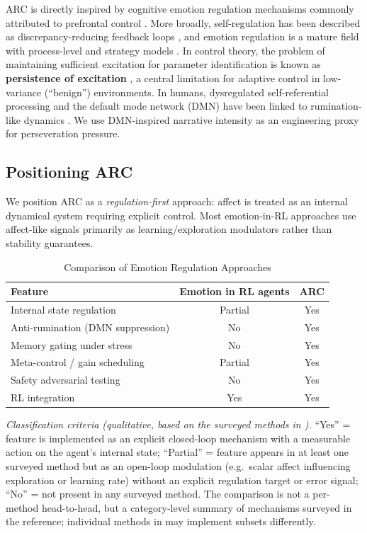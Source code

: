 \documentclass{article}
\begin{document}
ARC is directly inspired by cognitive emotion regulation mechanisms commonly attributed to prefrontal control \cite{Ochsner2005}. More broadly, self-regulation has been described as discrepancy-reducing feedback loops \cite{Carver1982}, and emotion regulation is a mature field with process-level and strategy models \cite{Gross1998}. In control theory, the problem of maintaining sufficient excitation for parameter identification is known as \textbf{persistence of excitation} \cite{Astrom2008}, a central limitation for adaptive control in low-variance (``benign'') environments.
In humans, dysregulated self-referential processing and the default mode network (DMN) have been linked to rumination-like dynamics \cite{Raichle2001, Buckner2008, Hamilton2015}. We use DMN-inspired narrative intensity as an engineering proxy for perseveration pressure.

\subsection{Positioning ARC}

We position ARC as a \textit{regulation-first} approach: affect is treated as an internal dynamical system requiring explicit control. Most emotion-in-RL approaches use affect-like signals primarily as learning/exploration modulators rather than stability guarantees.

\begin{table}[htbp]
\centering
\caption{Comparison of Emotion Regulation Approaches}
\label{tab:comparison}
\begin{tabular}{@{}lcc@{}}
\toprule
Feature & Emotion in RL agents \cite{Moerland2018} & \textbf{ARC} \\ \midrule
Internal state regulation & Partial & Yes \\
Anti-rumination (DMN suppression) & No & Yes \\
Memory gating under stress & No & Yes \\
Meta-control / gain scheduling & Partial & Yes \\
Safety adversarial testing & No & Yes \\
RL integration & Yes & Yes \\ \bottomrule
\end{tabular}
\end{table}

\textit{Classification criteria (qualitative, based on the surveyed methods in \cite{Moerland2018}).} ``Yes'' = feature is implemented as an explicit closed-loop mechanism with a measurable action on the agent's internal state; ``Partial'' = feature appears in at least one surveyed method but as an open-loop modulation (e.g.\ scalar affect influencing exploration or learning rate) without an explicit regulation target or error signal; ``No'' = not present in any surveyed method. The comparison is not a per-method head-to-head, but a category-level summary of mechanisms surveyed in the reference; individual methods in \cite{Moerland2018} may implement subsets differently.
\end{document}
